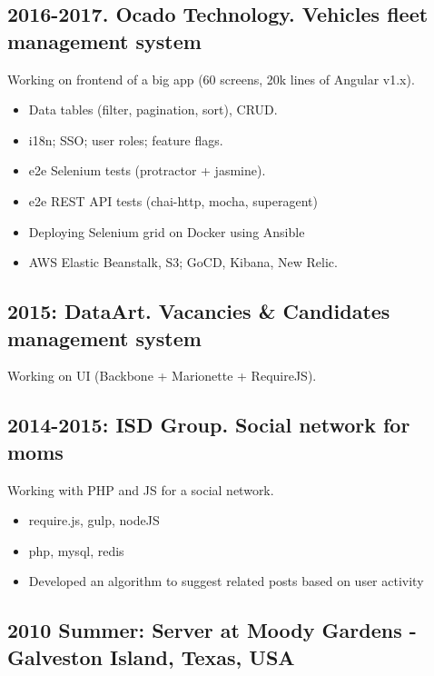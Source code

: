 \documentclass[a4paper, 14pt]{article}
\begin{document}
  \subsection{2016-2017. Ocado Technology. Vehicles fleet management system}
    Working on frontend of a big app (60 screens, 20k lines of Angular v1.x).
    \begin{itemize}
      \item Data tables (filter, pagination, sort), CRUD. \\
      \item i18n; SSO; user roles; feature flags. \\
      \item e2e Selenium tests (protractor + jasmine). \\
      \item e2e REST API tests (chai-http, mocha, superagent) \\
      \item Deploying Selenium grid on Docker using Ansible \\
      \item AWS Elastic Beanstalk, S3; GoCD, Kibana, New Relic.
    \end{itemize}

  \subsection{2015: DataArt. Vacancies \& Candidates management system}
    Working on UI (Backbone + Marionette + RequireJS).

	\subsection{2014-2015: ISD Group. Social network for moms}
    Working with PHP and JS for a social network.
      \begin{itemize}
        \item require.js, gulp, nodeJS \\
        \item php, mysql, redis \\
        \item Developed an algorithm to suggest related posts based on user activity
      \end{itemize}

  \subsection{2010 Summer: Server at Moody Gardens - Galveston Island, Texas, USA}
\end{document}
